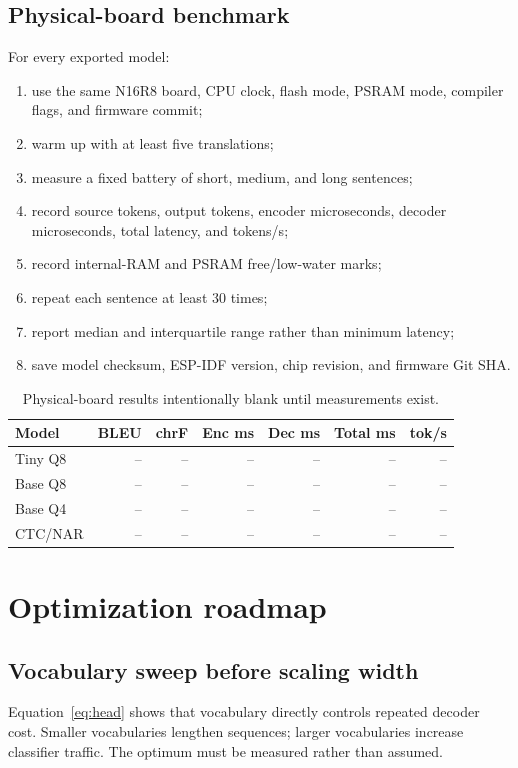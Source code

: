 \documentclass{article}
\begin{document}
\subsection{Physical-board benchmark}
For every exported model:
\begin{enumerate}[leftmargin=*]
\item use the same N16R8 board, CPU clock, flash mode, PSRAM mode, compiler flags, and firmware commit;
\item warm up with at least five translations;
\item measure a fixed battery of short, medium, and long sentences;
\item record source tokens, output tokens, encoder microseconds, decoder microseconds, total latency, and tokens/s;
\item record internal-RAM and PSRAM free/low-water marks;
\item repeat each sentence at least 30 times;
\item report median and interquartile range rather than minimum latency;
\item save model checksum, ESP-IDF version, chip revision, and firmware Git SHA.
\end{enumerate}

\begin{table}[H]
\centering
\caption{Physical-board results intentionally blank until measurements exist.}
\begin{tabular}{lrrrrrr}
\toprule
Model & BLEU & chrF & Enc ms & Dec ms & Total ms & tok/s\\
\midrule
Tiny Q8 & -- & -- & -- & -- & -- & --\\
Base Q8 & -- & -- & -- & -- & -- & --\\
Base Q4 & -- & -- & -- & -- & -- & --\\
CTC/NAR & -- & -- & -- & -- & -- & --\\
\bottomrule
\end{tabular}
\end{table}

\section{Optimization roadmap}
\subsection{Vocabulary sweep before scaling width}
Equation~\ref{eq:head} shows that vocabulary directly controls repeated decoder cost. Smaller vocabularies lengthen sequences; larger vocabularies increase classifier traffic. The optimum must be measured rather than assumed.
\end{document}
